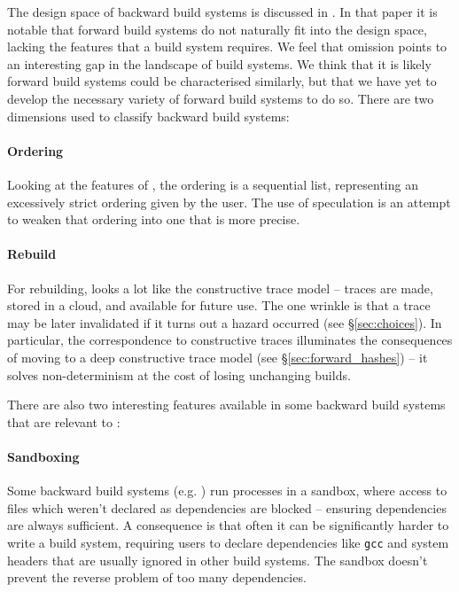 The design space of backward build systems is discussed in \cite{build_systems_a_la_carte}. In that paper it is notable that forward build systems do not naturally fit into the design space, lacking the features that a build system requires. We feel that omission points to an interesting gap in the landscape of build systems. We think that it is likely forward build systems could be characterised similarly, but that we have yet to develop the necessary variety of forward build systems to do so. There are two dimensions used to classify backward build systems:

\paragraph{Ordering} Looking at the features of \Rattle, the ordering is a sequential list, representing an excessively strict ordering given by the user. The use of speculation is an attempt to weaken that ordering into one that is more precise.

\paragraph{Rebuild} For rebuilding, \Rattle looks a lot like the constructive trace model -- traces are made, stored in a cloud, and available for future use. The one wrinkle is that a trace may be later invalidated if it turns out a hazard occurred (see \S\ref{sec:choices}). In particular, the correspondence to constructive traces illuminates the consequences of moving to a deep constructive trace model (see \S\ref{sec:forward_hashes}) -- it solves non-determinism at the cost of losing unchanging builds.

\postparagraphs

There are also two interesting features available in some backward build systems that are relevant to \Rattle:

\paragraph{Sandboxing} Some backward build systems (e.g. \Bazel \cite{bazel}) run processes in a sandbox, where access to files which weren't declared as dependencies are blocked -- ensuring dependencies are always sufficient. A consequence is that often it can be significantly harder to write a \Bazel build system, requiring users to declare dependencies like \texttt{gcc} and system headers that are usually ignored in other build systems. The sandbox doesn't prevent the reverse problem of too many dependencies.

